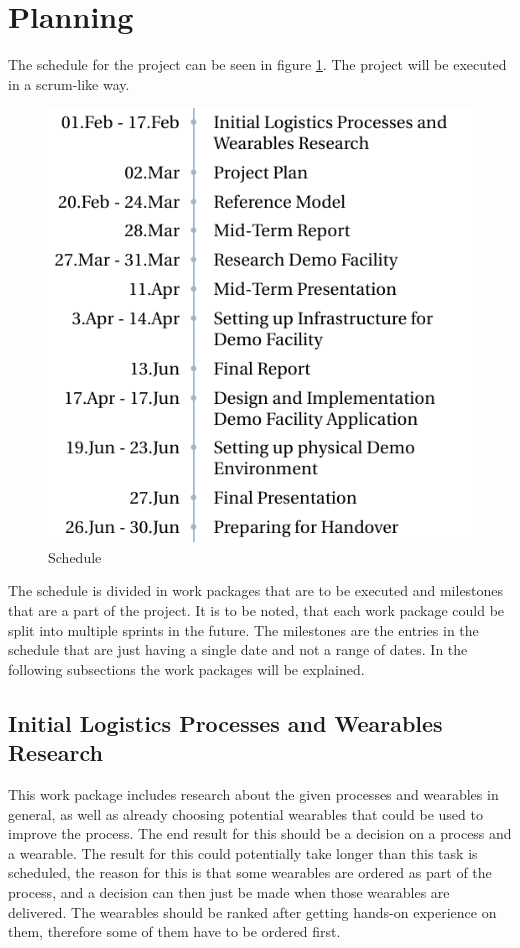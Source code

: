 \clearpage
\section{Planning}\label{sec:planning}
The schedule for the project can be seen in figure \ref{tab:schedule}. The project will be executed in a scrum-like way.

\begin{figure}[H]
	\begin{center}
		\includegraphics[scale=1]{images/schedule}
	\end{center}
\caption{Schedule}
\label{tab:schedule}
\end{figure}

The schedule is divided in work packages that are to be executed and milestones that are a part of the project. It is to be noted, that each work package could be split into multiple sprints in the future. The milestones are the entries in the schedule that are just having a single date and not a range of dates. In the following subsections the work packages will be explained.

\subsection{Initial Logistics Processes and Wearables Research}
This work package includes research about the given processes and wearables in general, as well as already choosing potential wearables that could be used to improve the process. The end result for this should be a decision on a process and a wearable. The result for this could potentially take longer than this task is scheduled, the reason for this is that some wearables are ordered as part of the process, and a decision can then just be made when those wearables are delivered. The wearables should be ranked after getting hands-on experience on them, therefore some of them have to be ordered first.


